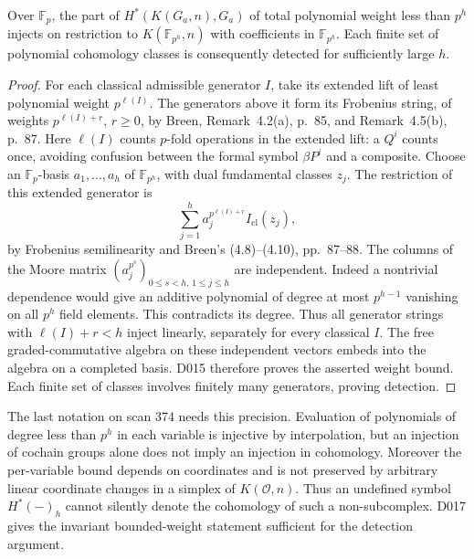 \begin{proposition}
\label{sa08:D017}
Over $\mathbb F_p$, the part of
$H^*(K(G_a,n),G_a)$ of total polynomial weight less than $p^h$
injects on restriction to $K(\mathbb F_{p^h},n)$ with coefficients
in $\mathbb F_{p^h}$. Each finite set of polynomial cohomology
classes is consequently detected for sufficiently large $h$.
\end{proposition}
\begin{proof}
For each classical admissible generator $I$, take its extended
lift of least polynomial weight $p^{\ell(I)}$. The generators
above it form its Frobenius string, of weights
$p^{\ell(I)+r}$, $r\geq0$, by Breen, Remark~4.2(a), p.~85,
and Remark~4.5(b), p.~87. Here $\ell(I)$ counts $p$-fold operations
in the extended lift: a $Q^i$ counts once, avoiding confusion
between the formal symbol $\beta P^i$ and a composite.
Choose an $\mathbb F_p$-basis $a_1,\ldots,a_h$ of
$\mathbb F_{p^h}$, with dual fundamental classes $z_j$.
The restriction of this extended generator is
\[
 \sum_{j=1}^h a_j^{p^{\ell(I)+r}}I_{\mathrm{cl}}(z_j),
\]
by Frobenius semilinearity and Breen's (4.8)--(4.10), pp.~87--88.
The columns of the Moore matrix
$(a_j^{p^s})_{0\leq s<h,\,1\leq j\leq h}$ are independent.
Indeed a nontrivial dependence would give an additive polynomial
of degree at most $p^{h-1}$ vanishing on all $p^h$ field elements.
This contradicts its degree. Thus all generator strings with
$\ell(I)+r<h$ inject linearly, separately for every classical
$I$. The free graded-commutative algebra on these independent
vectors embeds into the algebra on a completed basis.
D015 therefore proves the asserted weight bound. Each finite set
of classes involves finitely many generators, proving detection.
\end{proof}

The last notation on scan 374 needs this precision. Evaluation of
polynomials of degree less than $p^h$ in each variable is injective
by interpolation, but an injection of cochain groups alone does
not imply an injection in cohomology. Moreover the per-variable
bound depends on coordinates and is not preserved by arbitrary
linear coordinate changes in a simplex of $K(\mathcal O,n)$.
Thus an undefined symbol $H^*(-)_h$ cannot silently denote the
cohomology of such a non-subcomplex. D017 gives the invariant
bounded-weight statement sufficient for the detection argument.

